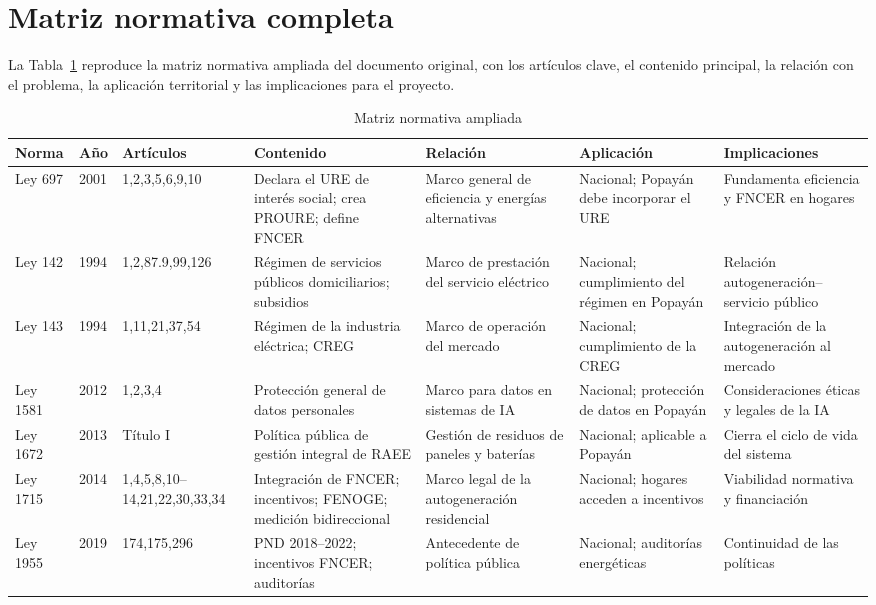 \appendices
\section{Matriz normativa completa}
La Tabla~\ref{tab:matriz completa} reproduce la matriz normativa ampliada del documento original, con los artículos clave, el contenido principal, la relación con el problema, la aplicación territorial y las implicaciones para el proyecto.
\begin{table}[p]
\caption{Matriz normativa ampliada}
\label{tab:matriz completa}
\centering\scriptsize
\begin{tabular}{@{}p{}p{}p{}p{}p{}p{}p{}@{}}
\toprule
Norma & Año & Artículos & Contenido & Relación & Aplicación & Implicaciones \\
\midrule
Ley 697 & 2001 & 1,2,3,5,6,9,10 & Declara el URE de interés social; crea PROURE; define FNCER & Marco general de eficiencia y energías alternativas & Nacional; Popayán debe incorporar el URE & Fundamenta eficiencia y FNCER en hogares \\
Ley 142 & 1994 & 1,2,87.9,99,126 & Régimen de servicios públicos domiciliarios; subsidios & Marco de prestación del servicio eléctrico & Nacional; cumplimiento del régimen en Popayán & Relación autogeneración--servicio público \\
Ley 143 & 1994 & 1,11,21,37,54 & Régimen de la industria eléctrica; CREG & Marco de operación del mercado & Nacional; cumplimiento de la CREG & Integración de la autogeneración al mercado \\
Ley 1581 & 2012 & 1,2,3,4 & Protección general de datos personales & Marco para datos en sistemas de IA & Nacional; protección de datos en Popayán & Consideraciones éticas y legales de la IA \\
Ley 1672 & 2013 & Título I & Política pública de gestión integral de RAEE & Gestión de residuos de paneles y baterías & Nacional; aplicable a Popayán & Cierra el ciclo de vida del sistema \\
Ley 1715 & 2014 & 1,4,5,8,10--14,21,22,30,33,34 & Integración de FNCER; incentivos; FENOGE; medición bidireccional & Marco legal de la autogeneración residencial & Nacional; hogares acceden a incentivos & Viabilidad normativa y financiación \\
Ley 1955 & 2019 & 174,175,296 & PND 2018--2022; incentivos FNCER; auditorías & Antecedente de política pública & Nacional; auditorías energéticas & Continuidad de las políticas \\

\end{tabular}
\end{table}

